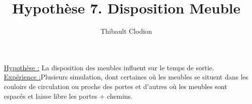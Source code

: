 \documentclass[12pt]{article}
\title{Hypothèse 7. Disposition Meuble}
\author{Thibault Clodion}
\begin{document}
\maketitle %

\underline{Hypothèse :} La disposition des meubles influent sur le temps de sortie.
\newline\newline
\underline{Expérience :}Plusieurs simulation, dont certaines où les meubles se situent dans les couloirs de circulation ou proche des portes et d'autres où les meubles sont espacés et laisse libre les portes + chemins.
\newline\newline
\end{document}
